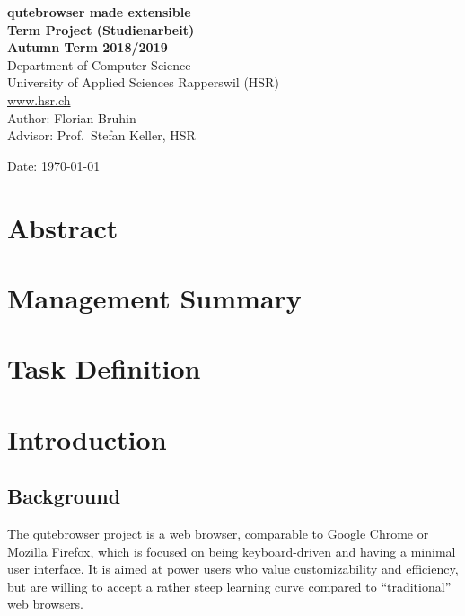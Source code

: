 \documentclass[a4paper,parskip=full]{scrreprt}
\begin{document}
\begin{titlepage}
\begin{flushleft}
{\huge \bfseries qutebrowser made extensible}\\[0.5cm]
{\large \bfseries Term Project (Studienarbeit) \\[0.2cm] Autumn Term 2018/2019}\\[2cm]

Department of Computer Science\\
University of Applied Sciences Rapperswil (HSR)\\
\url{www.hsr.ch}\\[1cm]

Author: Florian Bruhin\\[0.3cm]
Advisor: Prof.~Stefan Keller, HSR

\vfill
Date: {\today}

\end{flushleft}

\end{titlepage}



\chapter*{Abstract}

\chapter*{Management Summary}


\tableofcontents

\listoffigures
{\let\clearpage\relax \listoftables}
{\let\clearpage\relax \listoflistings}


\chapter*{Task Definition}

\chapter{Introduction}
\label{ch:intro}

\section{Background}

The qutebrowser project is a web browser, comparable to Google Chrome or Mozilla
Firefox, which is focused on being keyboard-driven and having a minimal user
interface. It is aimed at power users who value customizability and efficiency,
but are willing to accept a rather steep learning curve compared to
``traditional'' web browsers.
\end{document}
